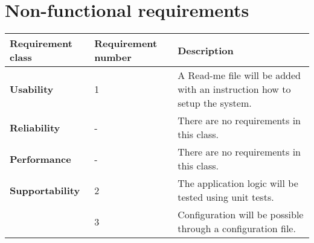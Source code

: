 \documentclass[11pt,a4paper]{article}
\begin{document}
\section*{Non-functional requirements}
\begin{longtable}{| p{3.5cm} | l | p{5.5cm} |}
\hline
\textbf{Requirement class} & Requirement number & Description \\ \hline
\textbf{Usability} & 1 & A Read-me file will be added with an instruction how to setup the system. \\ \hline
\textbf{Reliability} & - & There are no requirements in this class. \\ \hline
\textbf{Performance} & - & There are no requirements in this class. \\ \hline
\textbf{Supportability} & 2 & The application logic will be tested using unit tests.\\ \cline{2-3}
 & 3 & Configuration will be possible through a configuration file.\\ \hline
\end{longtable}
\end{document}
